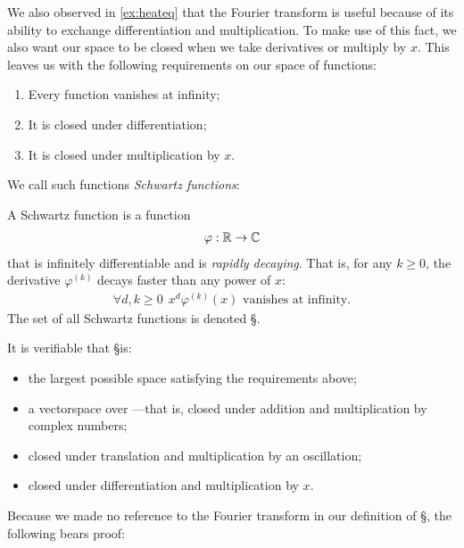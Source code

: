       We also observed in \cref{ex:heateq} that the Fourier transform is useful because of its ability to exchange differentiation and multiplication.
      To make use of this fact, we also want our space to be closed when we take derivatives or multiply by $x$.
      This leaves us with the following requirements on our space of functions:
      \begin{enumerate}[label=(\alph*)]
        \item \label{i:vanish}Every function vanishes at infinity;
        \item \label{i:diff}It is closed under differentiation;
        \item \label{i:mult}It is closed under multiplication by $x$.
      \end{enumerate}
      We call such functions \emph{Schwartz functions}:

      \begin{defn}
        A Schwartz function is a function
        \begin{align*}
          \varphi:\mathbb{R}\rightarrow\mathbb{C}
        \end{align*}
        that is infinitely differentiable and is \emph{rapidly decaying}.
        That is, for any $k\ge0$, the derivative $\varphi^{(k)}$ decays faster than any power of $x$:
        \begin{align*}
          \forall d,k\ge0\ \ x^d\varphi^{(k)}(x)\text{ vanishes at infinity} \text{.}
        \end{align*}
        The set of all Schwartz functions is denoted \S.
      \end{defn}
      It is verifiable that \S is:
      \begin{itemize}
        \item the largest possible space satisfying the requirements above;
        \item a vectorspace over \C---that is, closed under addition and multiplication by complex numbers;
        \item closed under translation and multiplication by an oscillation;
        \item closed under differentiation and multiplication by $x$.
      \end{itemize}

      Because we made no reference to the Fourier transform in our definition of \S, the following bears proof:

